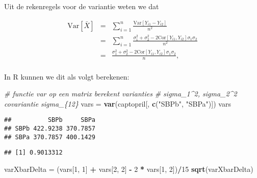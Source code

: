 \documentclass[12pt,dutch,coursenotes]{book}
\newenvironment{Shaded}{\begin{snugshade}}{\end{snugshade}}
\newcommand{\KeywordTok}[1]{\textcolor[rgb]{0.13,0.29,0.53}{\textbf{#1}}}
\newcommand{\DecValTok}[1]{\textcolor[rgb]{0.00,0.00,0.81}{#1}}
\newcommand{\StringTok}[1]{\textcolor[rgb]{0.31,0.60,0.02}{#1}}
\newcommand{\CommentTok}[1]{\textcolor[rgb]{0.56,0.35,0.01}{\textit{#1}}}
\newcommand{\OperatorTok}[1]{\textcolor[rgb]{0.81,0.36,0.00}{\textbf{#1}}}
\newcommand{\NormalTok}[1]{#1}
\theoremstyle{definition}
\theoremstyle{definition}
\theoremstyle{definition}
\theoremstyle{remark}
\begin{document}
Uit de rekenregels voor de variantie weten we dat

\begin{eqnarray*}
\text{Var}\left[\bar X\right]&=&\sum_{i=1}^n \frac{\text{Var}\left[Y_{i1}-Y_{i2}\right]}{n^2}\\
&=&\sum_{i=1}^n \frac{\sigma^2_1+\sigma^2_2-2\text{Cor}\left[Y_{i1},Y_{i2}\right]\sigma_1\sigma_2}{n^2}\\
&=&\frac{\sigma^2_1+\sigma^2_2-2\text{Cor}\left[Y_{i1},Y_{i2}\right]\sigma_1\sigma_2}{n},\\
\end{eqnarray*}

In R kunnen we dit als volgt berekenen:

\begin{Shaded}
\begin{Highlighting}[]
\CommentTok{# functie var op een matrix berekent varianties}
\CommentTok{# sigma_1^2, sigma_2^2 covariantie sigma_\{12\}}
\NormalTok{vars =}\StringTok{ }\KeywordTok{var}\NormalTok{(captopril[, }\KeywordTok{c}\NormalTok{(}\StringTok{"SBPb"}\NormalTok{, }\StringTok{"SBPa"}\NormalTok{)])}
\NormalTok{vars}
\end{Highlighting}
\end{Shaded}

\begin{verbatim}
##          SBPb     SBPa
## SBPb 422.9238 370.7857
## SBPa 370.7857 400.1429
\end{verbatim}

\begin{Shaded}
\end{Shaded}

\begin{verbatim}
## [1] 0.9013312
\end{verbatim}

\begin{Shaded}
\begin{Highlighting}[]
\NormalTok{varXbarDelta =}\StringTok{ }\NormalTok{(vars[}\DecValTok{1}\NormalTok{, }\DecValTok{1}\NormalTok{] }\OperatorTok{+}\StringTok{ }\NormalTok{vars[}\DecValTok{2}\NormalTok{, }\DecValTok{2}\NormalTok{] }\OperatorTok{-}\StringTok{ }\DecValTok{2} \OperatorTok{*}\StringTok{ }\NormalTok{vars[}\DecValTok{1}\NormalTok{, }
    \DecValTok{2}\NormalTok{])}\OperatorTok{/}\DecValTok{15}
\KeywordTok{sqrt}\NormalTok{(varXbarDelta)}
\end{Highlighting}
\end{Shaded}
\end{document}
